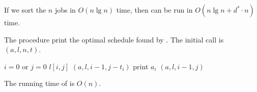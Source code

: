 \documentclass[a4paper, fleqn]{article}
\begin{document}
If we sort the $n$ jobs in $O(n \lg n)$ time, then  can
be run in $O(n \lg n + d^* \cdot n)$ time.

The procedure  print the optimal schedule found
by . The initial call is
$(a,l,n,t)$.

\begin{codebox}
\li \If $i = 0$ or $j = 0$
\li   \Then
        \Return
      \End
\li \If $l[i,j]$
\li   \Then
        $(a, l, i-1, j - t_i)$
\li     print $a_i$
\li   \Else
        $(a, l, i-1, j)$
      \End
\end{codebox}

The running time of  is $O(n)$.
\end{document}
